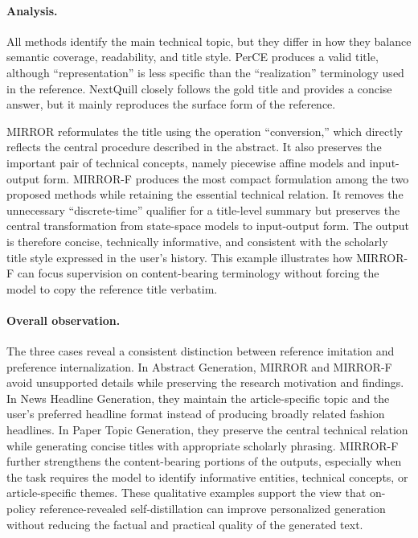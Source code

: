 \documentclass{article} %
\begin{document}
\paragraph{Analysis.}
All methods identify the main technical topic, but they differ in how they balance semantic coverage, readability, and title style. PerCE produces a valid title, although ``representation'' is less specific than the ``realization'' terminology used in the reference. NextQuill closely follows the gold title and provides a concise answer, but it mainly reproduces the surface form of the reference.

MIRROR reformulates the title using the operation ``conversion,'' which directly reflects the central procedure described in the abstract. It also preserves the important pair of technical concepts, namely piecewise affine models and input-output form. MIRROR-F produces the most compact formulation among the two proposed methods while retaining the essential technical relation. It removes the unnecessary ``discrete-time'' qualifier for a title-level summary but preserves the central transformation from state-space models to input-output form. The output is therefore concise, technically informative, and consistent with the scholarly title style expressed in the user's history. This example illustrates how MIRROR-F can focus supervision on content-bearing terminology without forcing the model to copy the reference title verbatim.

\paragraph{Overall observation.}
The three cases reveal a consistent distinction between reference imitation and preference internalization. In Abstract Generation, MIRROR and MIRROR-F avoid unsupported details while preserving the research motivation and findings. In News Headline Generation, they maintain the article-specific topic and the user's preferred headline format instead of producing broadly related fashion headlines. In Paper Topic Generation, they preserve the central technical relation while generating concise titles with appropriate scholarly phrasing. MIRROR-F further strengthens the content-bearing portions of the outputs, especially when the task requires the model to identify informative entities, technical concepts, or article-specific themes. These qualitative examples support the view that on-policy reference-revealed self-distillation can improve personalized generation without reducing the factual and practical quality of the generated text.
\end{document}
